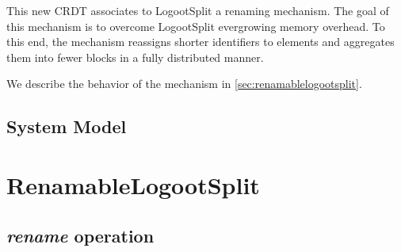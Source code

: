 \documentclass[sigplan,10pt]{acmart}
\begin{document}
This new \ac{CRDT} associates to LogootSplit a renaming mechanism.
The goal of this mechanism is to overcome LogootSplit evergrowing memory overhead.
To this end, the mechanism reassigns shorter identifiers to elements and aggregates them into fewer blocks in a fully distributed manner.

We describe the behavior of the mechanism in \autoref{sec:renamablelogootsplit}.

\subsection{System Model}


\section{RenamableLogootSplit}
\label{sec:renamablelogootsplit}

\subsection{\emph{rename} operation}
\end{document}
